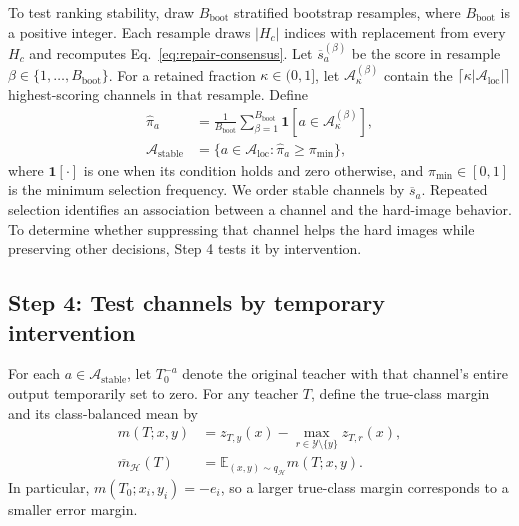 \documentclass[review,number,sort&compress]{elsarticle}
\theoremstyle{definition}
\begin{document}
To test ranking stability, draw $B_{\mathrm{boot}}$ stratified
bootstrap resamples, where $B_{\mathrm{boot}}$ is a positive
integer. Each resample draws $|H_c|$ indices with replacement
from every $H_c$ and recomputes Eq.~\eqref{eq:repair-consensus}.
Let $\overline{s}_a^{(\beta)}$ be the score in resample
$\beta\in\{1,\ldots,B_{\mathrm{boot}}\}$.
For a retained fraction $\kappa\in(0,1]$, let
$\mathcal A_{\kappa}^{(\beta)}$ contain the
$\lceil\kappa|\mathcal A_{\mathrm{loc}}|\rceil$
highest-scoring channels in that resample. Define
\begin{equation}
\label{eq:repair-stability}
\begin{aligned}
\widehat{\pi}_a
&=\frac{1}{B_{\mathrm{boot}}}
  \sum_{\beta=1}^{B_{\mathrm{boot}}}
  \mathbf{1}[a\in\mathcal A_{\kappa}^{(\beta)}],\\
\mathcal A_{\mathrm{stable}}
&=\{a\in\mathcal A_{\mathrm{loc}}:
                \widehat{\pi}_a\geq\pi_{\min}\},
\end{aligned}
\end{equation}
where $\mathbf{1}[\cdot]$ is one when its condition holds
and zero otherwise, and $\pi_{\min}\in[0,1]$ is the minimum
selection frequency. We order stable channels by
$\overline{s}_a$. Repeated selection identifies an association
between a channel and the hard-image behavior. To determine
whether suppressing that channel helps the hard images while
preserving other decisions, Step 4 tests it by intervention.

\subsection{Step 4: Test channels by temporary intervention}

For each $a\in\mathcal A_{\mathrm{stable}}$, let $T_0^{-a}$
denote the original teacher with that channel's entire
output temporarily set to zero. For any teacher $T$, define
the true-class margin and its class-balanced mean by
\begin{equation}
\label{eq:repair-true-margin}
\begin{aligned}
m(T;x,y)&=z_{T,y}(x)-
 \max_{r\in\mathcal Y\setminus\{y\}}z_{T,r}(x),\\
\overline m_{\mathcal H}(T)
&=\mathbb E_{(x,y)\sim q_{\mathcal H}}m(T;x,y).
\end{aligned}
\end{equation}
In particular, $m(T_0;x_i,y_i)=-e_i$, so a larger true-class
margin corresponds to a smaller error margin.
\end{document}

